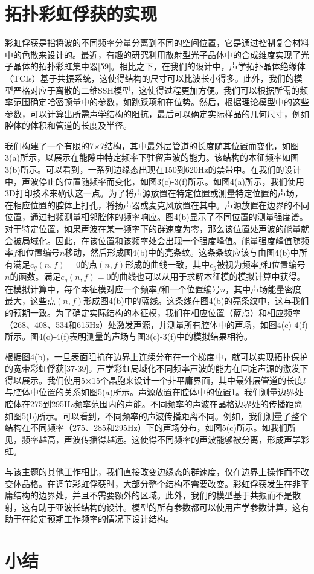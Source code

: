 \section{拓扑彩虹俘获的实现}
彩虹俘获是指将波的不同频率分量分离到不同的空间位置，它是通过控制复合材料中的色散来设计的。最近，有趣的研究利用散射型光子晶体中的合成维度实现了光子晶体的拓扑彩虹集中器[59]。相比之下，在我们的设计中，声学拓扑晶体绝缘体（TCIs）基于共振系统，这使得结构的尺寸可以比波长小得多。此外，我们的模型严格对应于离散的二维SSH模型，这使得过程更加方便。我们可以根据所需的频率范围确定哈密顿量中的参数，如跳跃项和在位势。然后，根据理论模型中的这些参数，可以计算出所需声学结构的阻抗，最后可以确定实际样品的几何尺寸，例如腔体的体积和管道的长度及半径。

我们构建了一个有限的7×7结构，其中最外层管道的长度随其位置而变化，如图3(a)所示，以展示在能隙中特定频率下驻留声波的能力。该结构的本征频率如图3(b)所示。可以看到，一系列边缘态出现在150到620Hz的禁带中。在我们的设计中，声波停止的位置随频率而变化，如图3(c)-3(f)所示。如图4(a)所示，我们使用3D打印技术来确认这一点。为了将声源放置在特定位置或测量特定位置的声场，在相应位置的腔体上打孔，将扬声器或麦克风放置在其中。声源放置在边界的不同位置，通过扫频测量相邻腔体的频率响应。图4(b)显示了不同位置的测量强度谱。对于特定位置，如果声波在某一频率下的群速度为零，那么该位置处声波的能量就会被局域化。因此，在该位置和该频率处会出现一个强度峰值。能量强度峰值随频率$f$和位置编号$n$移动，然后形成图4(b)中的亮条纹。这条条纹应该与由图4(b)中所有满足$c_g(n,f)=0$的点$(n,f)$形成的曲线一致，其中$c_g$被视为频率$f$和位置编号$n$的函数。满足$c_g(n,f)=0$的曲线也可以从用于求解本征模的模拟计算中获得。在模拟计算中，每个本征模对应一个频率$f$和一个位置编号$n$，其中声场能量密度最大，这些点$(n,f)$形成图4(b)中的蓝线。这条线在图4(b)的亮条纹中，这与我们的预期一致。为了确定实际结构的本征模，我们在相应位置（蓝点）和相应频率（268、408、534和615Hz）处激发声源，并测量所有腔体中的声场，如图4(c)-4(f)所示。图4(c)-4(f)表明测量的声场与图3(c)-3(f)中的模拟结果相符。

根据图4(b)，一旦表面阻抗在边界上连续分布在一个梯度中，就可以实现拓扑保护的宽带彩虹俘获[37-39]。声学彩虹局域化不同频率声波的能力在固定声源的激发下得以展示。我们使用5×15个晶胞来设计一个非平庸界面，其中最外层管道的长度$l$与腔体中位置的关系如图5(a)所示。声源放置在腔体中的位置1。我们测量边界处腔体在275到295Hz频率范围内的声能。不同频率的声波在晶格边界处的传播距离如图5(b)所示。可以看到，不同频率的声波传播距离不同。例如，我们测量了整个结构在不同频率（275、285和295Hz）下的声场分布，如图5(c)所示。如我们所见，频率越高，声波传播得越远。这使得不同频率的声波能够被分离，形成声学彩虹。

与该主题的其他工作相比，我们直接改变边缘态的群速度，仅在边界上操作而不改变体晶格。在调节彩虹俘获时，大部分整个结构不需要改变。彩虹俘获发生在非平庸结构的边界处，并且不需要额外的区域。此外，我们的模型基于共振而不是散射，这有助于亚波长结构的设计。模型的所有参数都可以使用声学参数计算，这有助于在给定预期工作频率的情况下设计结构。

\section{小结}